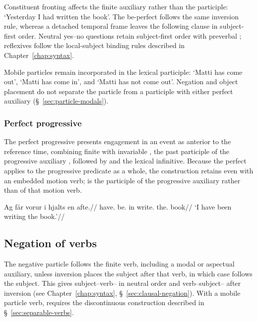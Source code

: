 Constituent fronting affects the finite auxiliary rather than the participle:  `Yesterday I had written the book'. The be-perfect follows the same inversion rule, whereas a detached temporal frame leaves the following clause in subject-first order. Neutral yes--no questions retain subject-first order with preverbal ; reflexives follow the local-subject binding rules described in Chapter~\ref{chap:syntax}.

Mobile particles remain incorporated in the lexical participle:  `Matti has come out',  `Matti has come in', and  `Matti has not come out'. Negation and object placement do not separate the particle from a participle with either perfect auxiliary (\S~\ref{sec:particle-modals}).

\subsubsection{Perfect progressive}

The perfect progressive presents engagement in an event as anterior to the reference time, combining finite  with invariable , the past participle of the progressive auxiliary , followed by  and the lexical infinitive. Because the perfect applies to the progressive predicate as a whole, the construction retains  even with an embedded motion verb;  is the participle of the progressive auxiliary rather than of that motion verb.

\pex
\begingl
\gla Ag får vorur i hjalts en afte.//
\glb \First{}\Sg{} have.\Pres{} be.\PstP{} in write.\Inf{} the.\M{} book//
\glft `I have been writing the book.'//
\endgl
\xe

\subsection{Negation of verbs}
\label{sec:verb-negation}

The negative particle  follows the finite verb, including a modal or aspectual auxiliary, unless inversion places the subject after that verb, in which case  follows the subject. This gives subject--verb-- in neutral order and verb--subject-- after inversion (see Chapter~\ref{chap:syntax}, \S~\ref{sec:clausal-negation}). With a mobile particle verb,  requires the discontinuous construction described in \S~\ref{sec:separable-verbs}.

